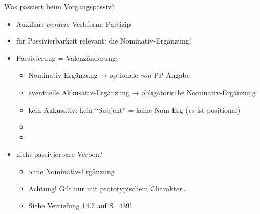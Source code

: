 \begin{frame}
\begin{exe}
\begin{xlist}
      \end{xlist}
      \pause
      \ex\label{ex:werdenpassivundverbtypen128}
      \begin{xlist}\addtolength\itemsep{-0.5\baselineskip}
      \end{xlist}
    \end{exe}
\end{frame}

\begin{frame}
  {Was passiert beim Vorgangspassiv?}
  \pause
  \begin{itemize}[<+->]
    \item Auxiliar: \textit{werden}, Verbform: Partizip
    \item für Passivierbarkeit relevant: \alert{die Nominativ-Ergänzung!}
      \Halbzeile
    \item \alert{Passivierung = Valenzänderung}:
      \begin{itemize}[<+->]
        \item Nominativ-Ergänzung → optionale \textit{von}-PP-Angabe
        \item eventuelle Akkusativ-Ergänzung → obligatorische Nominativ-Ergänzung
        \item kein Akkusativ: kein "`Subjekt"' = keine Nom-Erg (\textit{es} ist positional)
        \item {}
        \item {}
      \end{itemize}
    \Halbzeile
  \item \alert{nicht passivierbare Verben}?
    \begin{itemize}[<+->]
      \item {ohne }\alert{ Nominativ-Ergänzung}
      \item Achtung! Gilt nur mit prototypischem Charakter\ldots
      \item Siehe Vertiefung 14.2 auf S.~439!
    \end{itemize}
  \end{itemize}
\end{frame}

